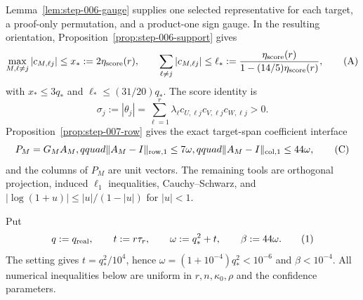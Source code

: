 Lemma~\ref{lem:step-006-gauge} supplies one selected representative for each
target, a proof-only permutation, and a product-one sign gauge. In the
resulting orientation, Proposition~\ref{prop:step-006-support} gives
\[
\max_{M,\ell\ne j}|c_{M,\ell j}|\le
x_*:=2\eta_{\rm score}(r),\qquad
\sum_{\ell\ne j}|c_{M,\ell j}|\le
\ell_*:=\frac{\eta_{\rm score}(r)}
{1-(14/5)\eta_{\rm score}(r)},
\tag{A}
\]
with $x_*\le3q_*$ and $\ell_*\le(31/20)q_*$. The score identity is
\[
\sigma_j:=|\theta_j|
=\sum_{\ell=1}^r\lambda_\ell
c_{U,\ell j}c_{V,\ell j}c_{W,\ell j}>0.
\tag{B}
\]
Proposition~\ref{prop:step-007-row} gives the exact target-span coefficient
interface
\[
P_M=G_MA_M,qquad
\|A_M-I\|_{\rm row,1}\le7\omega,qquad
\|A_M-I\|_{\rm col,1}\le44\omega,
\tag{C}
\]
and the columns of $P_M$ are unit vectors. The remaining tools are orthogonal
projection, induced $\ell_1$ inequalities, Cauchy--Schwarz, and
$|\log(1+u)|\le |u|/(1-|u|)$ for $|u|<1$.

Put
\[
 q:=q_{\rm real},\qquad t:=r\tau_r,\qquad
 \omega:=q_*^2+t,\qquad \beta:=44\omega. \tag{1}
\]
The setting gives $t=q_*^2/10^4$, hence
$\omega=(1+10^{-4})q_*^2<10^{-6}$ and $\beta<10^{-4}$. All numerical
inequalities below are uniform in $r,n,\kappa_0,\rho$ and the confidence
parameters.


